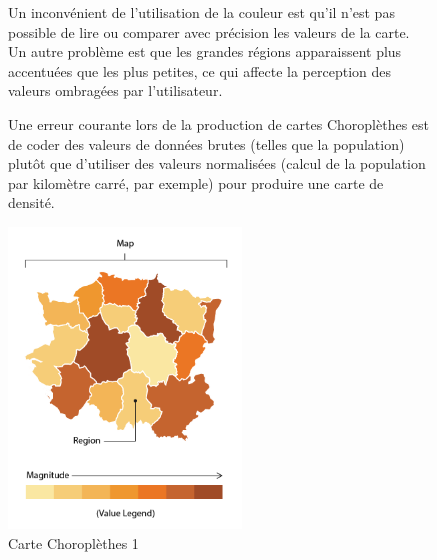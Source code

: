 \documentclass[french, a4paper, 12pt]{report}
\begin{document}
\begin{figure}[!htb]
\begin{minipage}{0.46\linewidth}
Un inconvénient de l'utilisation de la couleur est qu’il n’est pas possible de lire ou comparer avec précision les valeurs de la carte. Un autre problème est que les grandes régions apparaissent plus accentuées que les plus petites, ce qui affecte la perception des valeurs ombragées par l’utilisateur. 

Une erreur courante lors de la production de cartes Choroplèthes est de coder des valeurs de données brutes (telles que la population) plutôt que d'utiliser des valeurs normalisées (calcul de la population par kilomètre carré, par exemple) pour produire une carte de densité.
\end{minipage}\hfil
\begin{minipage}{0.35\linewidth}
    \includegraphics[height=8cm]{images/choropleth-zoom.png}
    \caption{Carte Choroplèthes 1}
 \label{fig:1.10}
\end{minipage}
\end{figure}
\end{document}
